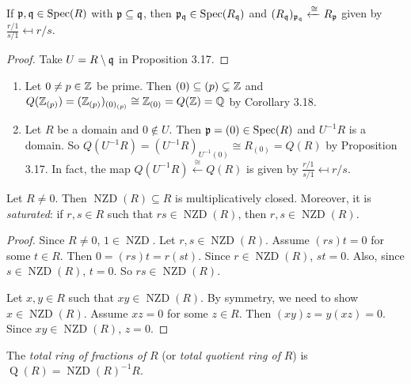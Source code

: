 \begin{corollary}
    If $\mathfrak{p},\mathfrak{q} \in \operatorname{Spec}(R)$ with $\mathfrak{p} \subseteq \mathfrak{q}$, then $\mathfrak{p}_{\mathfrak{q}} \in \operatorname{Spec}(R_{\mathfrak{q}})$ and $(R_{\mathfrak{q}})_{\mathfrak{p}_{\mathfrak{q}}} \xleftarrow \cong R_{\mathfrak{p}}$ given by $\frac{r/1}{s/1} \mapsfrom r/s$.
\end{corollary}

\begin{proof}
    Take $U = R \setminus \mathfrak{q}$ in Proposition 3.17.
\end{proof}

\begin{example*}
    \begin{enumerate}
        \item Let $0 \neq p \in \mathbb{Z}$ be prime. Then $(0) \subseteq (p) \subsetneq \mathbb{Z}$ and $Q(\mathbb{Z}_{(p)}) = (\mathbb{Z}_{(p)})_{(0)_{(p)}} \cong \mathbb{Z}_{(0)} = Q(\mathbb{Z}) = \mathbb{Q}$ by Corollary 3.18.
        \item Let $R$ be a domain and $0 \not \in U$. Then $\mathfrak{p} = (0) \in \operatorname{Spec}(R)$ and $U^{-1}R$ is a domain. So $Q(U^{-1}R) = (U^{-1}R)_{U^{-1}(0)} \cong R_{(0)} = Q(R)$ by Proposition 3.17. In fact, the map $Q(U^{-1}R) \xleftarrow \cong Q(R)$ is given by $\frac{r/1}{s/1} \mapsfrom r/s$.
    \end{enumerate}
\end{example*}

\begin{proposition}
    Let $R \neq 0$. Then $\operatorname{NZD}(R) \subseteq R$ is multiplicatively closed. Moreover, it is \emph{saturated}: if $r,s \in R$ such that $rs \in \operatorname{NZD}(R)$, then $r,s \in \operatorname{NZD}(R)$. 
\end{proposition}

\begin{proof}
    Since $R \neq 0$, $1 \in \operatorname{NZD}$. Let $r,s \in \operatorname{NZD}(R)$. Assume $(rs)t=0$ for some $t \in R$. Then $0 = (rs)t = r(st)$. Since $r \in \operatorname{NZD}(R)$, $st = 0$. Also, since $s \in \operatorname{NZD}(R)$, $t = 0$. So $rs \in \operatorname{NZD}(R)$. \par 
    Let $x,y \in R$ such that $xy \in \operatorname{NZD}(R)$. By symmetry, we need to show $x \in \operatorname{NZD}(R)$. Assume $xz = 0$ for some $z \in R$. Then $(xy)z = y(xz) = 0$. Since $xy \in \operatorname{NZD}(R)$, $z = 0$.
\end{proof}

\begin{definition}
    The \emph{total ring of fractions of} $R$ (or \emph{total quotient ring of }$R$) is $\operatorname{Q}(R) = \operatorname{NZD}(R)^{-1}R$.
\end{definition}

